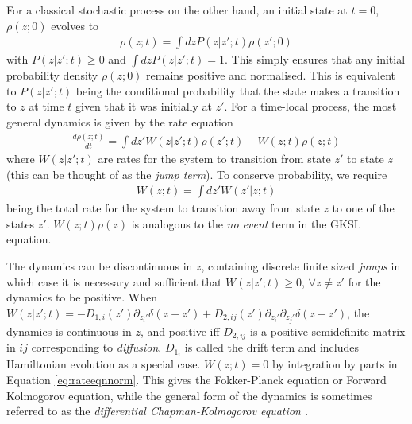 \documentclass[aps,pra,showpacs,citeautoscript,amsmath,amssymb,floatfix,superscriptaddress,bbm, verbatim,amsfonts,changes,11pt,nofootinbib,longbibliography]{revtex4-2}
\def\z{{z}}
\def\rate{{W}}
\def\t0{0}
\begin{document}
For a classical stochastic process on the other hand, an initial state at $t=\t0$, $\rho(\z;\t0)$ evolves to
\begin{align}
  \rho(\z;t)=
\int d\z  
  P(\z|\z';t)\rho(\z';\t0)
  \label{eq:c-non-markovian}
\end{align}
with $P(\z|\z';t)\geq 0$ 
and 
$\int d\z P(\z|\z';t)=1$. This simply ensures that any initial probability density
$\rho(\z;0)$ remains positive
and normalised. This is equivalent to $P(\z|\z';t)$ being the conditional probability that the state makes a transition to $\z$ at time $t$ given that it was initially at $\z'$. For a time-local process, the most general dynamics is given by the rate equation
\begin{align}
    \frac{d\rho(\z;t)}{dt}=\int d{\z'} \rate(\z|\z';t) \rho(\z';t) - \rate(\z;t)\rho(\z;t)
    \label{eq:rate-eqn}
  \end{align}
  where $\rate(\z|\z';t)$ are rates for the system to transition from state $\z'$ to state $\z$ (this can be thought of as the {\it jump term}). To conserve probability, we require 
  \begin{align}
  \rate(\z;t)=\int d{\z'} \rate(\z'|\z;t)
  \label{eq:rateeqnnorm}
  \end{align} 
  being the
  total rate for the system to transition away from state $\z$ to one of the states $\z'$.
  $W(\z;t) \rho(\z)$  is analogous to the {\it no event} term in the GKSL equation. 
 
 The dynamics can be discontinuous in $\z$, containing discrete finite sized {\it jumps} in which case
 it is necessary and sufficient that $\rate(\z|\z';t)\geq 0$, $\forall z\neq z'$ for the dynamics to be positive.
 When  
  $W(\z|\z';t)=-D_{1,i}(\z')\partial_{z_i'}\delta(\z-\z')+
  D_{2,ij}(\z')\partial_{z_i'}\partial_{z_j'}\delta(\z-\z')$, the dynamics is continuous in $\z$, and  positive iff
  $D_{2,ij}$ is a positive semidefinite matrix in $ij$ corresponding to {\it diffusion}. $D_{1_i}$ is called the drift term\label{par:drift} and includes Hamiltonian evolution as a special case. $\rate(\z;t)=0$ by integration by parts in Equation \eqref{eq:rateeqnnorm}. 
 This gives the Fokker-Planck equation or Forward Kolmogorov equation, while the general form of the dynamics
is sometimes referred to as the {\it differential Chapman-Kolmogorov equation \cite{gardiner2004handbook}.}
\end{document}
